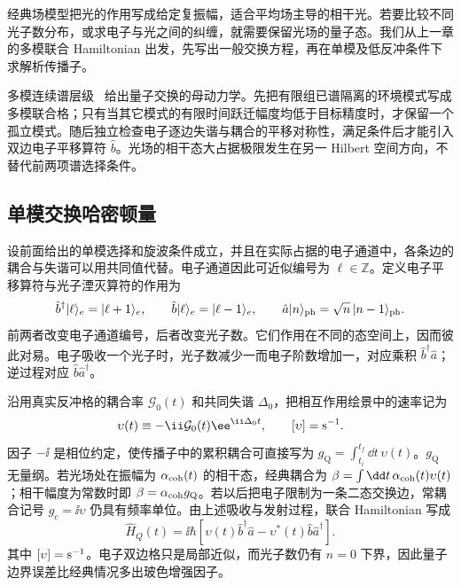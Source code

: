 经典场模型把光的作用写成给定复振幅，适合平均场主导的相干光。若要比较不同光子数分布，或求电子与光之间的纠缠，就需要保留光场的量子态。我们从上一章的多模联合 Hamiltonian 出发，先写出一般交换方程，再在单模及低反冲条件下求解析传播子。

多模连续谱层级~ 给出量子交换的母动力学。先把有限组已谱隔离的环境模式写成多模联合格；只有当其它模式的有限时间跃迁幅度均低于目标精度时，才保留一个孤立模式。随后独立检查电子逐边失谐与耦合的平移对称性，满足条件后才能引入双边电子平移算符 $\hat b$。光场的相干态大占据极限发生在另一 Hilbert 空间方向，不替代前两项谱选择条件。



\subsection{单模交换哈密顿量}

设前面给出的单模选择和旋波条件成立，并且在实际占据的电子通道中，各条边的耦合与失谐可以用共同值代替。电子通道因此可近似编号为 $\ell\in\mathbb Z$。定义电子平移算符与光子湮灭算符的作用为
\[
\hat b^\dagger|\ell\rangle_e=|\ell+1\rangle_e,\qquad
\hat b|\ell\rangle_e=|\ell-1\rangle_e,\qquad
\hat a|n\rangle_{\rm ph}=\sqrt n\,|n-1\rangle_{\rm ph}.
\]
前两者改变电子通道编号，后者改变光子数。它们作用在不同的态空间上，因而彼此对易。电子吸收一个光子时，光子数减少一而电子阶数增加一，对应乘积 $\hat b^\dagger\hat a$；逆过程对应 $\hat b\hat a^\dagger$。

沿用真实反冲格的耦合率 $\mathcal G_0(t)$ 和共同失谐 $\Delta_0$，把相互作用绘景中的速率记为
\[
\upsilon(t)\equiv-\ii\mathcal G_0(t)\ee^{\ii\Delta_0t},
\qquad [\upsilon]={\rm s^{-1}}.
\]
因子 $-\ii$ 是相位约定，使传播子中的累积耦合可直接写为
$g_{\mathrm Q}=\int_{t_i}^{t_f}\dd t\,\upsilon(t)$。$g_{\mathrm Q}$ 无量纲。若光场处在振幅为 $\alpha_{\rm coh}(t)$ 的相干态，经典耦合为 $\beta=\int\dd t\,\alpha_{\rm coh}(t)\upsilon(t)$；相干幅度为常数时即 $\beta=\alpha_{\rm coh}g_{\mathrm Q}$。若以后把电子限制为一条二态交换边，常耦合记号 $g_c=\ii\upsilon$ 仍具有频率单位。由上述吸收与发射过程，联合 Hamiltonian 写成
\begin{equation}
\boxed{
\hat H_Q(t)=\ii\hbar[\upsilon(t)\hat b^\dagger\hat a-\upsilon^*(t)\hat b \hat a^\dagger].}
\label{eq:qpinem-single-mode-hamiltonian-dp68}
\end{equation}
其中 $[\upsilon]={\rm s^{-1}}$。电子双边格只是局部近似，而光子数仍有 $n=0$ 下界，因此量子边界误差比经典情况多出玻色增强因子。

